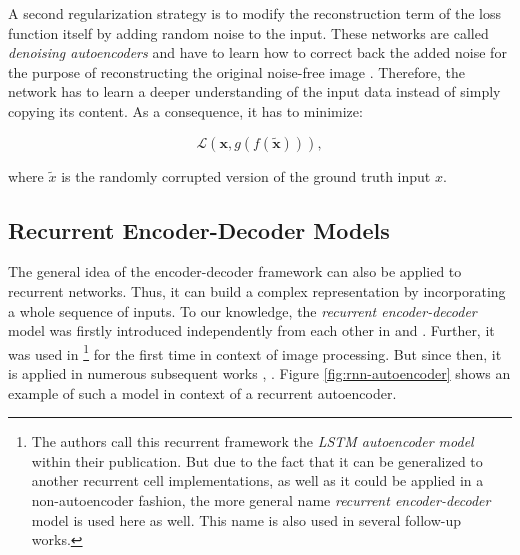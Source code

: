 A second regularization strategy is to modify the reconstruction term of the loss function itself by adding random noise to the input. These networks are called \textit{denoising autoencoders} and have to learn how to correct back the added noise for the purpose of reconstructing the original noise-free image \parencite[p. 507]{deep_learning}. Therefore, the network has to learn a deeper understanding of the input data instead of simply copying its content. As a consequence, it has to minimize:

\begin{equation} \label{eq:autoenc-denoise}
	\mathcal{L}(\textbf{x}, g(f(\tilde{\textbf{x}}))) ,
\end{equation}

where $ \tilde{x} $ is the randomly corrupted version of the ground truth input $ x $.


\subsection{Recurrent Encoder-Decoder Models} \label{sec:rnn_enc_dec}

The general idea of the encoder-decoder framework can also be applied to recurrent networks. Thus, it can build a complex representation by incorporating a whole sequence of inputs. To our knowledge, the \textit{recurrent encoder-decoder} model was firstly introduced independently from each other in \parencite{brnn_fist} and \parencite{brnn_second}. Further, it was used in  \parencite{unsup_learn_lstm}\footnote{The authors call this recurrent framework the \textit{LSTM autoencoder model} within their publication. But due to the fact that it can be generalized to another recurrent cell implementations, as well as it could be applied in a non-autoencoder fashion, the more general name \textit{recurrent encoder-decoder} model is used here as well. This name is also used in several follow-up works.} for the first time in context of image processing. But since then, it is applied in numerous subsequent works \parencite{rnn-enc-dec1}, \parencite{rnn-enc-dec2}. Figure \ref{fig:rnn-autoencoder} shows an example of such a model in context of a recurrent autoencoder.

